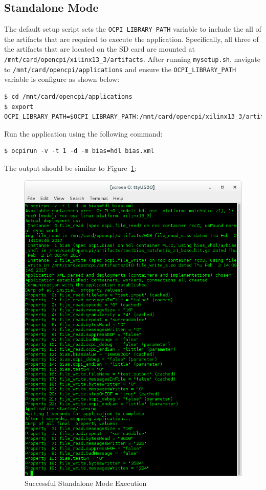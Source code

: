 \newpage
\subsection{Standalone Mode}
\begin{flushleft}
The default setup script sets the \texttt{OCPI\_LIBRARY\_PATH} variable to include the all of the artifacts that are required to execute the application. Specifically, all three of the artifacts that are located on the SD card are mounted at \texttt{/mnt/card/opencpi/xilinx13\_3/artifacts}.  After running \texttt{mysetup.sh}, navigate to \texttt{/mnt/card/opencpi/applications} and ensure the \texttt{OCPI\_LIBRARY\_PATH} variable is configure as shown below:
\begin{verbatim}
$ cd /mnt/card/opencpi/applications
$ export OCPI_LIBRARY_PATH=$OCPI_LIBRARY_PATH:/mnt/card/opencpi/xilinx13_3/artifacts
\end{verbatim}

Run the application using the following command:
\begin{verbatim}
$ ocpirun -v -t 1 -d -m bias=hdl bias.xml
\end{verbatim}
The output should be similar to Figure~\ref{fig:standBias}:
\end{flushleft}
\begin{figure}[H]
	\centerline{\includegraphics[scale=0.5]{Matchstiq_Z1_stand_bias}}
	\caption{Successful Standalone Mode Execution}
 \label{fig:standBias}
\end{figure}

